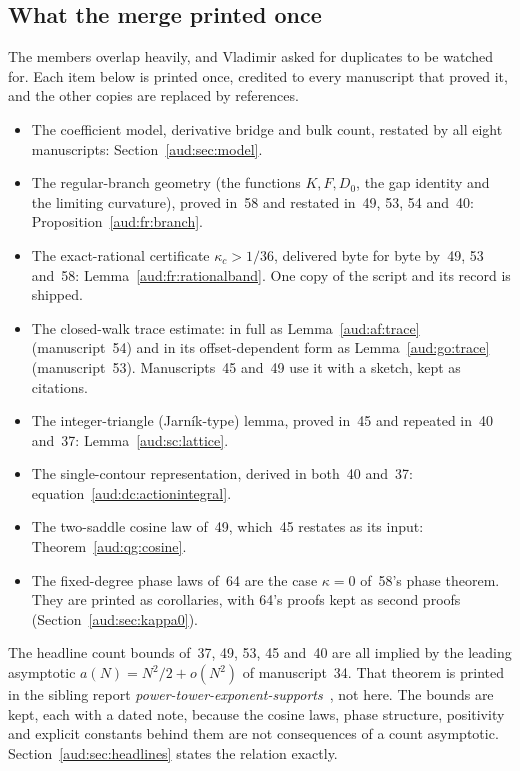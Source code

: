 \documentclass[11pt,a4paper]{article}
\numberwithin{equation}{section}
\begin{document}
\subsection{What the merge printed once}\label{aud:sec:printedonce}
The members overlap heavily, and Vladimir asked for duplicates to be watched for. Each item below is printed once, credited to every manuscript that proved it, and the other copies are replaced by references.
\begin{itemize}
\item The coefficient model, derivative bridge and bulk count, restated by all eight manuscripts: Section~\ref{aud:sec:model}.
\item The regular-branch geometry (the functions $K,F,D_0$, the gap identity and the limiting curvature), proved in~58 and restated in~49, 53, 54 and~40: Proposition~\ref{aud:fr:branch}.
\item The exact-rational certificate $\kappa_c>1/36$, delivered byte for byte by~49, 53 and~58: Lemma~\ref{aud:fr:rationalband}. One copy of the script and its record is shipped.
\item The closed-walk trace estimate: in full as Lemma~\ref{aud:af:trace} (manuscript~54) and in its offset-dependent form as Lemma~\ref{aud:go:trace} (manuscript~53). Manuscripts~45 and~49 use it with a sketch, kept as citations.
\item The integer-triangle (Jarn\'ik-type) lemma, proved in~45 and repeated in~40 and~37: Lemma~\ref{aud:sc:lattice}.
\item The single-contour representation, derived in both~40 and~37: equation~\eqref{aud:dc:actionintegral}.
\item The two-saddle cosine law of~49, which~45 restates as its input: Theorem~\ref{aud:qg:cosine}.
\item The fixed-degree phase laws of~64 are the case $\kappa=0$ of~58's phase theorem. They are printed as corollaries, with 64's proofs kept as second proofs (Section~\ref{aud:sec:kappa0}).
\end{itemize}
The headline count bounds of~37, 49, 53, 45 and~40 are all implied by the leading asymptotic $a(N)=N^2/2+o(N^2)$ of manuscript~34. That theorem is printed in the sibling report \emph{power-tower-exponent-supports}~\cite{pte}, not here. The bounds are kept, each with a dated note, because the cosine laws, phase structure, positivity and explicit constants behind them are not consequences of a count asymptotic. Section~\ref{aud:sec:headlines} states the relation exactly.
\end{document}
